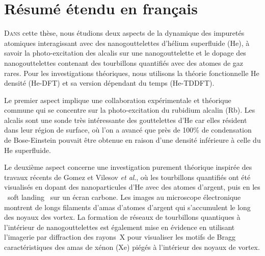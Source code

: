 \chapter{Résumé étendu en français} %
	\lettrine[lines=4]{\color{activeColor}D}{ans} cette thèse, nous étudions deux aspects de la dynamique des impuretés atomiques interagissant avec des nanogouttelettes d'hélium superfluide (He), à savoir la photo-excitation des alcalis sur une nanogouttelette et le dopage des nanogouttelettes contenant des tourbillons quantifiés avec des atomes de gaz rares. Pour les investigations théoriques, nous utilisons la théorie fonctionnelle He densité (He-DFT) et sa version dépendant du temps (He-TDDFT).

	Le premier aspect implique une collaboration expérimentale et théorique commune qui se concentre sur la photo-excitation du rubidium alcalin (Rb). Les alcalis sont une sonde très intéressante des gouttelettes d'He car elles résident dans leur région de surface, où l'on a avancé que près de 100\% de condensation de Bose-Einstein pouvait être obtenue en raison d'une densité inférieure à celle du He superfluide.
	
	Le deuxième aspect concerne une investigation purement théorique inspirée des travaux récents de Gomez et Vilesov \emph{et al}., où les tourbillons quantifiés ont été visualisés en dopant des nanoparticules d'He avec des atomes d'argent, puis en les \guillemotleft~soft landing~\guillemotright{} sur un écran carbone. Les images au microscope électronique montrent de longs filaments d'amas d'atomes d'argent qui s'accumulent le long des noyaux des vortex. La formation de réseaux de tourbillons quantiques à l'intérieur de nanogouttelettes est également mise en évidence en utilisant l'imagerie par diffraction des rayons~X pour visualiser les motifs de Bragg caractéristiques des amas de xénon (Xe) piégés à l'intérieur des noyaux de vortex.
	
